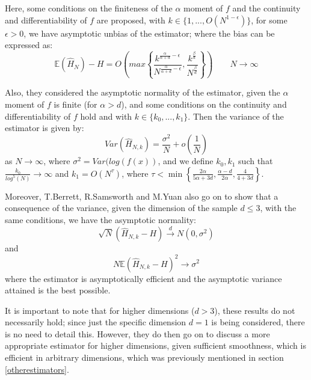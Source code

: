 \documentclass[12pt]{report}
\begin{document}
Here, some conditions on the finiteness of the $\alpha$ moment of $f$ and the continuity and differentiability of $f$ are proposed, with $k \in \{1, ..., O(N^{1-\epsilon})\}$, for some $\epsilon > 0$, we have asymptotic unbias of the estimator; where the bias can be expressed as:
\begin{equation}
\mathbb{E} ( \hat{H}_{N} ) - H = O \left( max \left\{ \frac{k^{\frac{\alpha}{\alpha + d} - \epsilon}}{N^{\frac{\alpha}{\alpha + d} - \epsilon}}, \frac{k^{\frac{\beta}{d}}}{N^{\frac{\beta}{d}}} \right\} \right) \quad \quad N \to \infty
\end{equation}

Also, they considered the asymptotic normality of the estimator, given the $\alpha$ moment of $f$ is finite (for $\alpha > d$), and some conditions on the continuity and differentiability of $f$ hold and with $k \in \{k_{0}, ..., k_{1}\}$. Then the variance of the estimator is given by:
\begin{equation}
Var(\hat{H}_{N, k}) = \frac{\sigma^2}{N} + o(\frac{1}{N})
\end{equation}
as $N \to \infty$, where $\sigma^2 = Var(log(f(x))$, and we define $k_{0}, k_{1}$ such that $\frac{k_{0}}{log^5(N)} \to \infty$ and $k_{1} = O(N^{\tau})$, where $\tau < \min \left\{ \frac{2 \alpha}{5 \alpha + 3d} , \frac{\alpha - d}{2 \alpha} , \frac{4}{4 + 3d} \right\}$. 

Moreover, T.Berrett, R.Samsworth and M.Yuan \cite{paper4} also go on to show that a consequence of the variance, given the dimension of the sample $d \leq 3$, with the same conditions, we have the asymptotic normality:
\begin{equation}
\sqrt{N}(\hat{H}_{N, k} - H) \xrightarrow{d} N(0, \sigma^2)
\end{equation}
and 
\begin{equation} 
N \mathbb{E}{(\hat{H}_{N, k} - H)^2} \xrightarrow{} \sigma^2
\end{equation}
where the estimator is asymptotically efficient and the asymptotic variance attained is the best possible.

It is important to note that for higher dimensions ($d > 3$), these results do not necessarily hold; since just the specific dimension $d=1$ is being considered, there is no need to detail this. However, they do then go on to discuss a more appropriate estimator for higher dimensions, given sufficient smoothness, which is efficient in arbitrary dimensions, which was previously mentioned in section \ref{otherestimators}.
\end{document}

